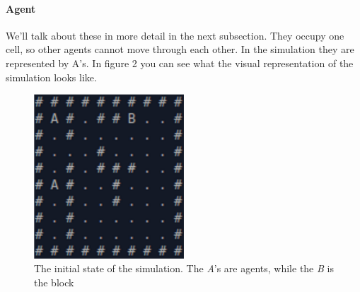 \paragraph{Agent}
We'll talk about these in more detail in the next subsection. They occupy one cell, so other agents cannot move through each other. In the simulation they are represented by A's.
In figure 2 you can see what the visual representation of the simulation looks like.
\begin{figure}[H]
\begin{center}
\caption{The initial state of the simulation. The \textit{A}'s are agents, while the \textit{B} is the block}
\includegraphics[width = 0.5\textwidth]{images/environment.png}
\end{center}
\end{figure}

